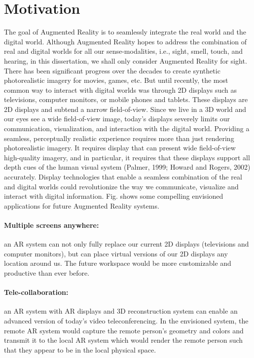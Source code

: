 \section{Motivation}



The goal of Augmented Reality is to seamlessly integrate the real world and the digital world.
Although Augmented Reality hopes to address the combination of real and digital worlds for all our sense-modalities, i.e., sight, smell, touch, and hearing, in this dissertation, we shall only consider Augmented Reality for sight. 
There has been significant progress over the decades to create synthetic photorealistic imagery for movies, games, etc. 
But until recently, the most common way to interact with digital worlds was through 2D displays such as televisions, computer monitors, or mobile phones and tablets. 
These displays are 2D displays and subtend a narrow field-of-view. 
Since we live in a 3D world and our eyes see a wide field-of-view image, today’s displays severely limits our communication, visualization, and interaction with the digital world. 
Providing a seamless, perceptually realistic experience requires more than just rendering photorealistic imagery. 
It requires display that can present wide field-of-view high-quality imagery, and in particular, it requires that these displays support all depth cues of the human visual system (Palmer, 1999; Howard and Rogers, 2002) accurately. 
Display technologies that enable a seamless combination of the real and digital worlds could revolutionize the way we communicate, visualize and interact with digital information.
Fig.  shows some compelling envisioned applications for future Augmented Reality systems.

\paragraph{Multiple screens anywhere:} an AR system can not only fully replace our current 2D displays (televisions and computer monitors), but can place virtual versions of our 2D displays any location around us. 
The future workspace would be more customizable and productive than ever before.
\paragraph{Tele-collaboration:} an AR system with AR displays and 3D reconstruction system can enable an advanced version of today’s video teleconferencing. 
In the envisioned system, the remote AR system would capture the remote person’s geometry and colors and transmit it to the local AR system which would render the remote person such that they appear to be in the local physical space. 
